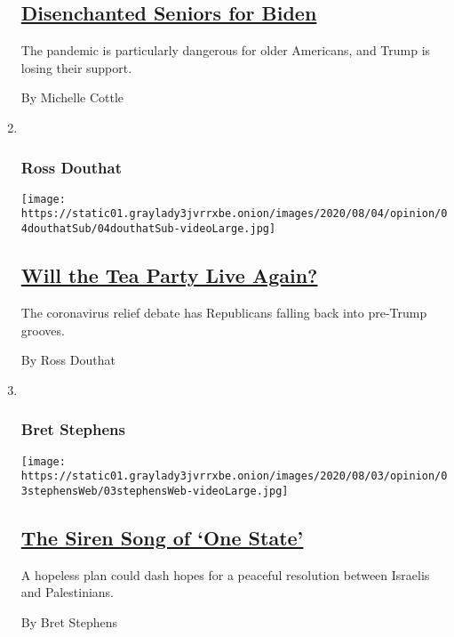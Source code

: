 \begin{enumerate}
  \hypertarget{disenchanted-seniors-for-biden}{%
  \subsection{\texorpdfstring{\href{/2020/08/03/opinion/senior-voters-biden-trump-2020.html}{Disenchanted
  Seniors for
  Biden}}{Disenchanted Seniors for Biden}}\label{disenchanted-seniors-for-biden}}

  The pandemic is particularly dangerous for older Americans, and Trump
  is losing their support.

  By Michelle Cottle
\item ~
  \hypertarget{ross-douthat}{%
  \subsubsection{Ross Douthat}\label{ross-douthat}}

  \texttt{[image: https://static01.graylady3jvrrxbe.onion/images/2020/08/04/opinion/04douthatSub/04douthatSub-videoLarge.jpg]}

  \hypertarget{will-the-tea-party-live-again}{%
  \subsection{\texorpdfstring{\href{/2020/08/04/opinion/trump-republicans-tea-party.html}{Will
  the Tea Party Live
  Again?}}{Will the Tea Party Live Again?}}\label{will-the-tea-party-live-again}}

  The coronavirus relief debate has Republicans falling back into
  pre-Trump grooves.

  By Ross Douthat
\item ~
  \hypertarget{bret-stephens}{%
  \subsubsection{Bret Stephens}\label{bret-stephens}}

  \texttt{[image: https://static01.graylady3jvrrxbe.onion/images/2020/08/03/opinion/03stephensWeb/03stephensWeb-videoLarge.jpg]}

  \hypertarget{the-siren-song-of-one-state}{%
  \subsection{\texorpdfstring{\href{/2020/08/03/opinion/israel-palestine-one-state-solution.html}{The
  Siren Song of `One
  State'}}{The Siren Song of `One State'}}\label{the-siren-song-of-one-state}}

  A hopeless plan could dash hopes for a peaceful resolution between
  Israelis and Palestinians.

  By Bret Stephens
\end{enumerate}


